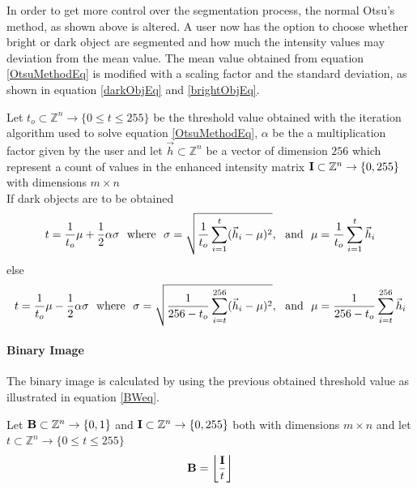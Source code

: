 \documentclass[11pt,fleqn,,a4paper,twoside,openright]{book}
\begin{document}
In order to get more control over the segmentation process, the normal Otsu's method, as shown above is altered. A user now has the option to choose whether bright or dark object are segmented and how much the intensity values may deviation from the mean value. The mean value obtained from equation \ref{OtsuMethodEq} is modified with a scaling factor and the standard deviation, as shown in equation \ref{darkObjEq} and \ref{brightObjEq}.
\begin{sBox}
	Let $ t_o \subset \mathbb{Z}^n \rightarrow \{0\leq t \leq 255\}$ be the threshold value obtained with the iteration algorithm used to solve equation \ref{OtsuMethodEq}, $ \alpha $ be the a multiplication factor given by the user and let $\vec{h} \subset \mathbb{Z}^n$ be a vector of dimension $256$ which represent a count of values in the enhanced intensity matrix $\mat{I} \subset \mathbb{Z}^n \rightarrow \{0, 255\}$ with dimensions $m \times n$\\
	If dark objects are to be obtained
	\begin{equation}\label{darkObjEq}
	t = \frac{1}{t_o}\mu + \frac{1}{2}\alpha\sigma {\rm \ \ where\ \ }\sigma = \sqrt{\frac{1}{t_o} \sum\limits_{i=1}^t (\vec{h}_i - \mu)^2}, {\rm \ \ and\ \ } \mu = \frac{1}{t_o} \sum\limits_{i=1}^t \vec{h}_i
	\end{equation}
	else
	\begin{equation}\label{brightObjEq}
	t = \frac{1}{t_o}\mu - \frac{1}{2}\alpha\sigma {\rm \ \ where\ \ }\sigma = \sqrt{\frac{1}{256 - t_o} \sum\limits_{i=t}^{256} (\vec{h}_i - \mu)^2}, {\rm \ \ and\ \ } \mu = \frac{1}{256 - t_o} \sum\limits_{i=t}^{256} \vec{h}_i
	\end{equation}
\end{sBox}

\paragraph{Binary Image}\label{binaryImage} The binary image is calculated by using the previous obtained threshold value as illustrated in equation \ref{BWeq}.
\begin{sBox}
	Let $\mat{B} \subset \mathbb{Z}^n \rightarrow \{0, 1\}$ and $\mat{I} \subset \mathbb{Z}^n \rightarrow \{0, 255\}$ both with dimensions $ m \times n $ and let $t \subset \mathbb{Z}^n \rightarrow \{0\leq t \leq 255\}$
	\begin{equation}\label{BWeq}
	\mat{B} = \floor*{\frac{\mat{I}}{t}}
	\end{equation}
\end{sBox}
\end{document}
